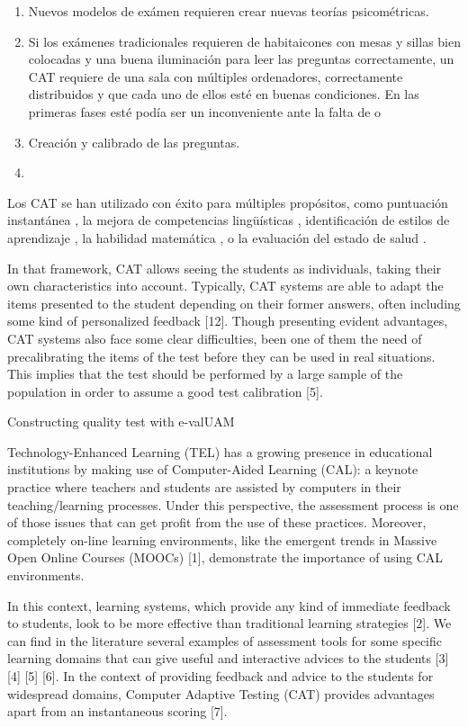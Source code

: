 \begin{enumerate}
	\item Nuevos modelos de exámen requieren crear nuevas teorías psicométricas.
	\item Si los exámenes tradicionales requieren de habitaicones con mesas y sillas bien colocadas y una buena iluminación para leer las preguntas correctamente, un \acrshort{CAT} requiere de una sala con múltiples ordenadores, correctamente distribuidos y que cada uno de ellos esté en buenas condiciones. En las primeras fases esté podía ser un inconveniente ante la falta de o
	\item Creación y calibrado de las preguntas.
	\item 
\end{enumerate}


Los \acrshort{CAT} se han utilizado con éxito para múltiples propósitos, como puntuación instantánea \cite{Wainer00}, la mejora de competencias lingüísticas \cite{Chapelle06} , identificación de estilos de aprendizaje \cite{Ortigosa10}, la habilidad matemática \cite{Klinkenberg11}, o la evaluación del estado de salud \cite{Revicki97}.


In that framework, CAT allows seeing the
students as individuals, taking their own characteristics into
account. Typically, CAT systems are able to adapt the items
presented to the student depending on their former answers, often
including some kind of personalized feedback [12].
Though presenting evident advantages, CAT systems also face
some clear difficulties, been one of them the need of precalibrating
the items of the test before they can be used in real
situations. This implies that the test should be performed by a
large sample of the population in order to assume a good test
calibration [5].


Constructing quality test with e-valUAM

Technology-Enhanced Learning (TEL) has a growing presence in educational institutions by making use of Computer-Aided Learning (CAL): a keynote practice where teachers and students are assisted by computers in their teaching/learning processes. Under this perspective, the assessment process is one of those issues that can get profit from the use of these practices. Moreover, completely on-line learning environments, like the emergent trends in Massive Open Online Courses (MOOCs) [1], demonstrate the importance of using CAL environments.

In this context, learning systems, which provide any kind of immediate feedback to students, look to be more effective than traditional learning strategies [2]. We can find in the literature several examples of assessment tools for some specific learning domains that can give useful and interactive advices to the students [3] [4] [5] [6]. In the context of providing feedback and advice to the students for widespread domains, Computer Adaptive Testing (CAT) provides advantages apart from an instantaneous scoring [7]. 

